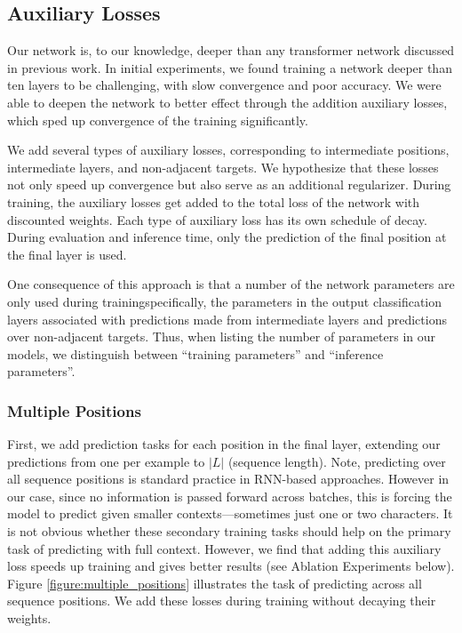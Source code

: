 \documentclass[letterpaper]{article}
\begin{document}
\subsection{Auxiliary Losses}
\label{section:aux}
Our network is, to our knowledge, deeper than any transformer network discussed in previous work.
In initial experiments, we found training a network deeper than ten layers to be challenging, with slow convergence and poor accuracy.
We were able to deepen the network to better effect through the addition auxiliary losses, which sped up convergence of the training significantly.

We add several types of auxiliary losses, corresponding to intermediate positions, intermediate layers, and non-adjacent targets.
We hypothesize that these losses not only speed up convergence but also serve as an additional regularizer.
During training, the auxiliary losses get added to the total loss of the network with discounted weights.
Each type of auxiliary loss has its own schedule of decay.
During evaluation and inference time, only the prediction of the final position at the final layer is used.

One consequence of this approach is that a number of the network parameters are only used during training\textemdash specifically, the parameters in the output classification layers associated with predictions made from intermediate layers and predictions over non-adjacent targets.
Thus, when listing the number of parameters in our models, we distinguish between ``training parameters'' and ``inference parameters''.


\subsubsection{Multiple Positions}

First, we add prediction tasks for each position in the final layer, extending our predictions from one per example to $|L|$ (sequence length).
Note, predicting over all sequence positions is standard practice in RNN-based approaches.
However in our case, since no information is passed forward across batches, this is forcing the model to predict given smaller contexts---sometimes just one or two characters.
It is not obvious whether these secondary training tasks should help on the primary task of predicting with full context.
However, we find that adding this auxiliary loss speeds up training and gives better results (see Ablation Experiments below).
Figure \ref{figure:multiple_positions} illustrates the task of predicting across all sequence positions.
We add these losses during training without decaying their weights.
\end{document}
